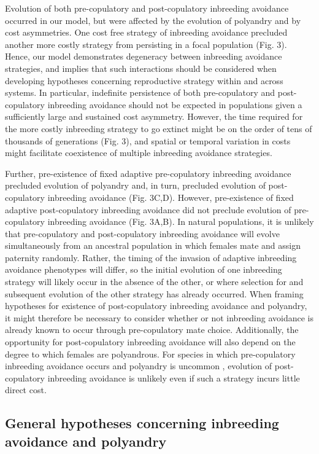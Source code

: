 \documentclass[12pt]{article}
\begin{document}
Evolution of both pre-copulatory and post-copulatory inbreeding avoidance occurred in our model, but were affected by the evolution of polyandry and by cost asymmetries. One cost free strategy of inbreeding avoidance precluded another more costly strategy from persisting in a focal population (Fig. 3). Hence, our model demonstrates degeneracy between inbreeding avoidance strategies, and implies that such interactions should be considered when developing hypotheses concerning reproductive strategy within and across systems. In particular, indefinite persistence of both pre-copulatory and post-copulatory inbreeding avoidance should not be expected in populations given a sufficiently large and sustained cost asymmetry. However, the time required for the more costly inbreeding strategy to go extinct might be on the order of tens of thousands of generations (Fig. 3), and spatial or temporal variation in costs might facilitate coexistence of multiple inbreeding avoidance strategies. 

Further, pre-existence of fixed adaptive pre-copulatory inbreeding avoidance precluded evolution of polyandry and, in turn, precluded evolution of post-copulatory inbreeding avoidance (Fig. 3C,D). However, pre-existence of fixed adaptive post-copulatory inbreeding avoidance did not preclude evolution of pre-copulatory inbreeding avoidance (Fig. 3A,B). In natural populations, it is unlikely that pre-copulatory and post-copulatory inbreeding avoidance will evolve simultaneously from an ancestral population in which females mate and assign paternity randomly. Rather, the timing of the invasion of adaptive inbreeding avoidance phenotypes will differ, so the initial evolution of one inbreeding strategy will likely occur in the absence of the other, or where selection for and subsequent evolution of the other strategy has already occurred. When framing hypotheses for existence of post-copulatory inbreeding avoidance and polyandry, it might therefore be necessary to consider whether or not inbreeding avoidance is already known to occur through pre-copulatory mate choice. Additionally, the opportunity for post-copulatory inbreeding avoidance will also depend on the degree to which females are polyandrous. For species in which pre-copulatory inbreeding avoidance occurs and polyandry is uncommon \cite[][]{Lihoreau2007, Metzger2010, Metzger2010a}, evolution of post-copulatory inbreeding avoidance is unlikely even if such a strategy incurs little direct cost. 

\subsection*{General hypotheses concerning inbreeding avoidance and polyandry}
\end{document}
